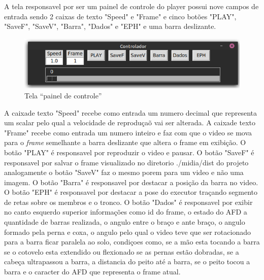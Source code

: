 A tela responsavel por ser um painel de controle do player possui nove campos de entrada sendo  2 caixas de texto  "Speed" e "Frame" e cinco botões "PLAY", "SaveF", "SaveV", "Barra", "Dados" e "EPH" e uma barra deslizante. 


\begin{figure}[H]
	\centering
	\caption{Tela ``painel de controle''}
	\includegraphics[scale=0.5]{figuras/view/painel_controller.png}
\end{figure}

A caixade texto "Speed" recebe como entrada um numero decimal que representa um scalar pelo qual a velocidade de reproduçaõ vai ser alterada. A caixade texto "Frame" recebe como entrada um numero inteiro e faz com que o video se mova para o \textit{frame} semelhante a barra deslizante que altera o frame em exibição. O botão "PLAY" é responsavel por reproduzir o video e pausar. O botão "SaveF" é responsavel por salvar o frame visualizado no diretorio ./midia/dist do projeto analogamente o botão "SaveV" faz o mesmo porem para um video e não uma imagem. O botão "Barra" é responsavel por  destacar a posição da barra no video. O botão "EPH" é responsavel por destacar a pose do executor traçando segmento de retas sobre os membros e o tronco. O botão "Dados" é responsavel por exibir no canto esquerdo superior informações como  
 id do frame, o estado do \ac{AFD} a quantidade de barras realizada, o angulo entre o braço e ante braço, o angulo formado pela perna e coxa, o angulo pelo qual o video teve que ser rotacionado para a barra ficar paralela ao solo, condiçoes como, se a mão esta tocando a barra se o cotovelo esta extendido ou flexionado se as pernas estão dobradas, se a cabeça ultrapassou a barra, a distancia do peito até a barra, se o peito tocou a barra e o caracter do \ac{AFD} que representa o frame atual.


